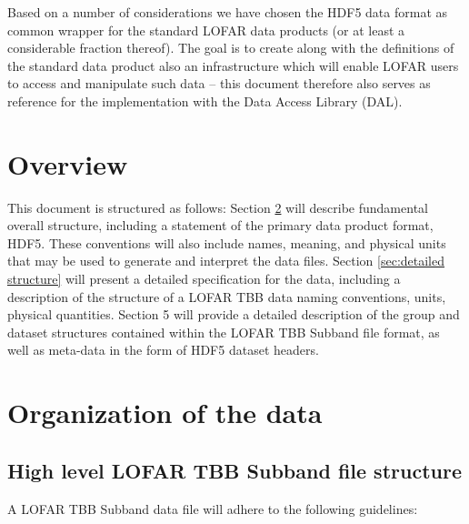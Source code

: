 \documentclass[a4paper,10pt,bibtotoc]{scrartcl}
\begin{document}
Based on a number of considerations we have chosen the HDF5 data
format as common wrapper for the standard LOFAR data products (or at
least a considerable fraction thereof). The goal is to create along
with the definitions of the standard data product also an
infrastructure which will enable LOFAR users to access and manipulate
such data -- this document therefore also serves as reference for the
implementation with the Data Access Library (DAL). 




\section{Overview}
\label{sec:overview}

This document is structured as follows: Section \ref{sec:structure}
will describe fundamental overall structure, including a statement of
the primary data product format, HDF5. These conventions will also
include names, meaning, and physical units that may be used to
generate and interpret the data ﬁles. Section \ref{sec:detailed structure} 
will present a detailed speciﬁcation for the data, including a
description of the structure of a LOFAR TBB data naming
conventions, units, physical quantities. Section 5 will provide a
detailed description of the group and dataset structures contained
within the LOFAR TBB Subband ﬁle format, as well as meta-data in
the form of HDF5 dataset headers.


\section{Organization of the data}
\label{sec:structure}

\subsection{High level LOFAR TBB Subband file structure}

A LOFAR  TBB Subband data file will adhere to the following guidelines:\\
\end{document}
